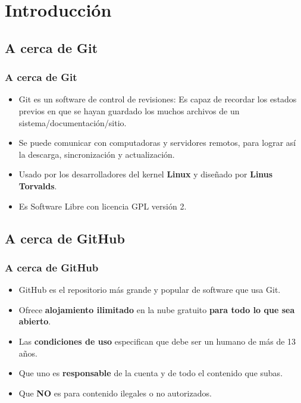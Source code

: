 %
%
%

\section{Introducción}

\subsection{A cerca de Git}
\begin{frame}
  \frametitle{A cerca de Git}
  \begin{itemize}
    \item<1-> Git es un software de control de revisiones: Es capaz de recordar los estados previos en que se hayan guardado los muchos archivos de un sistema/documentación/sitio.
    \item<2-> Se puede comunicar con computadoras y servidores remotos, para lograr así la descarga, sincronización y actualización.
    \item<3-> Usado por los desarrolladores del kernel \textbf{Linux} y diseñado por \textbf{Linus Torvalds}.
    \item<4-> Es Software Libre con licencia GPL versión 2.
  \end{itemize}
\end{frame}

\subsection{A cerca de GitHub}
\begin{frame}
  \frametitle{A cerca de GitHub}
  \begin{itemize}
    \item<1-> GitHub es el repositorio más grande y popular de software que usa Git.
    \item<2-> Ofrece \textbf{alojamiento ilimitado} en la nube gratuito \textbf{para todo lo que sea abierto}.
    \item<3-> Las \textbf{condiciones de uso} especifican que debe ser un humano de más de 13 años.
    \item<4-> Que uno es \textbf{responsable} de la cuenta y de todo el contenido que subas.
    \item<5-> Que \textbf{NO} es para contenido ilegales o no autorizados.
  \end{itemize}
\end{frame}
